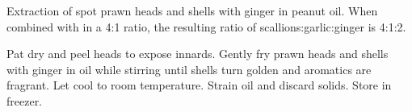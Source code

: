 \documentclass[main]{subfiles}
\begin{document}
Extraction of spot prawn heads and shells with ginger in peanut oil.
When combined with  in a 4:1 ratio,
the resulting ratio of scallions:garlic:ginger is 4:1:2.

\begin{rec}
Pat dry and peel heads to expose innards.
Gently fry prawn heads and shells with ginger in oil while stirring until shells turn golden and aromatics are fragrant.
Let cool to room temperature.
\newstep
Strain oil and discard solids. Store in freezer.
\end{rec}
\end{document}
